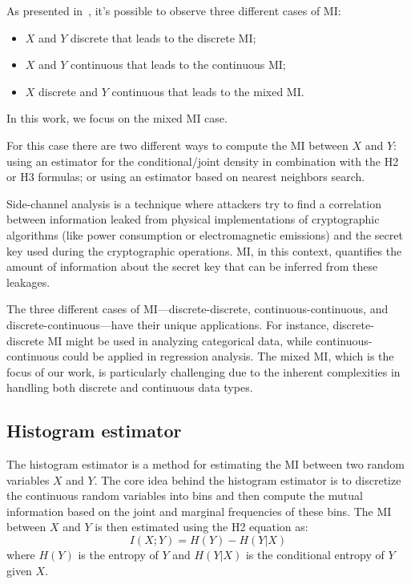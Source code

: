 \documentclass[12pt]{article}
\begin{document}
    As presented in~\cite{chowdhury_leakage_2022}, it's possible to observe three different cases of MI:
    \begin{itemize}
        \item $X$ and $Y$ discrete that leads to the discrete MI;
        \item $X$ and $Y$ continuous that leads to the continuous MI;
        \item $X$ discrete and $Y$ continuous that leads to the mixed MI\@.
    \end{itemize}

    In this work, we focus on the mixed MI case.

    For this case there are two different ways to compute the MI between $X$ and $Y$: using an estimator for the conditional/joint density in combination with the H2 or H3 formulas; or using an estimator based on nearest neighbors search.

    Side-channel analysis is a technique where attackers try to find a correlation between information leaked from physical implementations of cryptographic algorithms (like power consumption or electromagnetic emissions) and the secret key used during the cryptographic operations.
    MI, in this context, quantifies the amount of information about the secret key that can be inferred from these leakages.

    The three different cases of MI—discrete-discrete, continuous-continuous, and discrete-continuous—have their unique applications.
    For instance, discrete-discrete MI might be used in analyzing categorical data, while continuous-continuous could be applied in regression analysis.
    The mixed MI, which is the focus of our work, is particularly challenging due to the inherent complexities in handling both discrete and continuous data types.

    \subsection{Histogram estimator}\label{subsec:hist}
    The histogram estimator is a method for estimating the MI between two random variables $X$ and $Y$.
    The core idea behind the histogram estimator is to discretize the continuous random variables into bins and then compute the mutual information based on the joint and marginal frequencies of these bins.
    The MI between $X$ and $Y$ is then estimated using the H2 equation as:
    \begin{equation}
        I(X;Y) = H(Y) - H(Y|X)\label{eq:hist}
    \end{equation}
    where $H(Y)$ is the entropy of $Y$ and $H(Y|X)$ is the conditional entropy of $Y$ given $X$.
\end{document}
